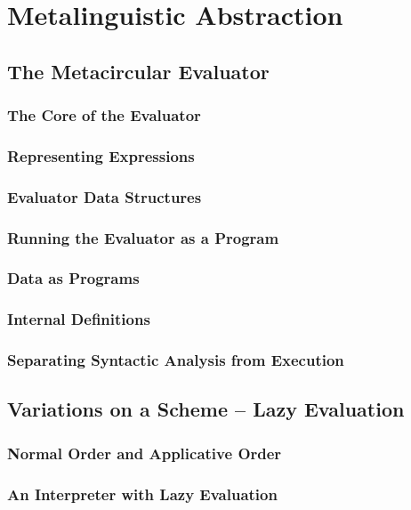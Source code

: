 %

    \section{Metalinguistic Abstraction}
        \subsection{The Metacircular Evaluator}
            \subsubsection{The Core of the Evaluator}
            \subsubsection{Representing Expressions}
            \subsubsection{Evaluator Data Structures}
            \subsubsection{Running the Evaluator as a Program}
            \subsubsection{Data as Programs}
            \subsubsection{Internal Definitions}
            \subsubsection{Separating Syntactic Analysis from Execution}
        \subsection{Variations on a Scheme -- Lazy Evaluation}
            \subsubsection{Normal Order and Applicative Order}
            \subsubsection{An Interpreter with Lazy Evaluation}
